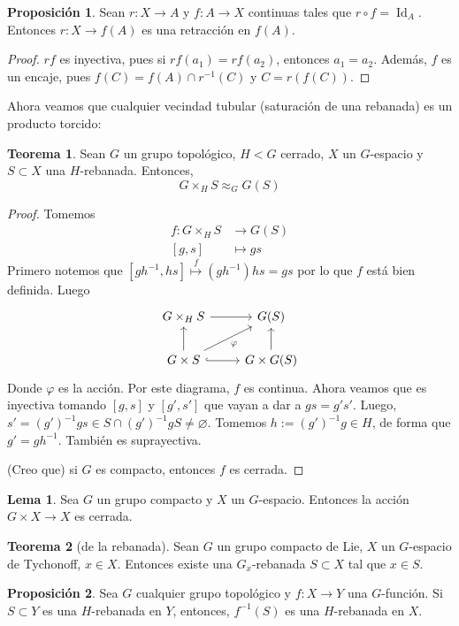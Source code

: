 \documentclass[spanish]{article}
\theoremstyle{definition}
\newtheorem*{lema}{Lema}
\newtheorem*{teo}{Teorema}
\newtheorem*{prop}{Proposición}
\DeclareMathOperator{\Id}{Id}
\begin{document}
\begin{prop}
	Sean $r:X\to A$ y $f:A\to X$ continuas tales que $r\circ f=\Id_A$. Entonces $r:X\to f(A)$ es una retracción en $f(A)$.
\end{prop}
\begin{proof}
	$rf$ es inyectiva, pues si $rf(a_1)=rf(a_2)$, entonces $a_1=a_2$. Además, $f$ es un encaje, pues $f(C)=f(A)\cap r^{-1}(C)$ y $C=r(f(C))$.
\end{proof}
Ahora veamos que cualquier vecindad tubular (saturación de una rebanada) es un producto torcido:
\begin{teo}
	Sean $G$ un grupo topológico, $H<G$ cerrado, $X$ un $G$-espacio y $S\subset X$ una $H$-rebanada. Entonces,
	\[G\times_HS\approx_GG(S)\]
\end{teo}
\begin{proof}
	Tomemos
	\begin{align*}
		f:G\times_HS&\to G(S)\\
		[g,s]&\mapsto gs
	\end{align*}
	Primero notemos que $[gh^{-1},hs]\overset{f}{\mapsto}(gh^{-1})hs=gs$ por lo que $f$ está bien definida. Luego
	\[\begin{tikzcd}
		G \times_H S \arrow{r} & G(S)\\
		G \times S \arrow{u} \arrow[swap]{ur}{\varphi}\arrow[hook]{r}&G\times G(S)\arrow{u}
	\end{tikzcd}\]
	Donde $\varphi$ es la acción. Por este diagrama, $f$ es continua. Ahora veamos que es inyectiva tomando $[g,s]$ y $[g',s']$ que vayan a dar a $gs=g's'$. Luego, $s'=(g')^{-1}gs\in S\cap(g')^{-1}gS\neq\varnothing$. Tomemos $h:=(g')^{-1}g\in H$, de forma que $g'=gh^{-1}$. También es suprayectiva.
	
	(Creo que) si $G$ es compacto, entonces $f$ es cerrada.
\end{proof}
\begin{lema}
	Sea $G$ un grupo compacto y $X$ un $G$-espacio. Entonces la acción $G\times X\to X$ es cerrada.
\end{lema}

\begin{teo}[de la rebanada]
	Sean $G$ un grupo compacto de Lie, $X$ un $G$-espacio de Tychonoff, $x\in X$. Entonces existe una $G_x$-rebanada $S\subset X$ tal que $x\in S$.
\end{teo}
\begin{prop}
	Sea $G$ cualquier grupo topológico y $f:X\to Y$ una $G$-función. Si $S\subset Y$ es una $H$-rebanada en $Y$, entonces, $f^{-1}(S)$ es una $H$-rebanada en $X$.
\end{prop}
\end{document}
